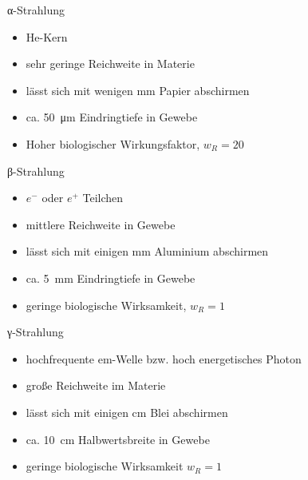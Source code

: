 \begin{frame}{α-Strahlung}
	\begin{itemize}
		\item He-Kern
		\item sehr geringe Reichweite in Materie
		\item lässt sich mit wenigen \si{\milli \meter} Papier abschirmen
		\item ca. \SI{50}{\micro \meter} Eindringtiefe in Gewebe
		\item Hoher biologischer Wirkungsfaktor, $w_R=20$
	\end{itemize}
\end{frame}
\begin{frame}{β-Strahlung}
\begin{itemize}
	\item $e^-$ oder $e^+$ Teilchen
	\item mittlere Reichweite in Gewebe
	\item lässt sich mit einigen \si{\milli \meter} Aluminium abschirmen
	\item ca. \SI{5}{\milli \meter} Eindringtiefe in Gewebe
	\item geringe biologische Wirksamkeit, $w_R=1$
\end{itemize}
\end{frame}
\begin{frame}{γ-Strahlung}
	\begin{itemize}
		\item hochfrequente em-Welle bzw. hoch energetisches Photon
		\item große Reichweite im Materie
		\item lässt sich mit einigen \si{\centi \meter} Blei abschirmen
		\item ca. \SI{10}{\centi \meter} Halbwertsbreite in Gewebe
		\item geringe biologische Wirksamkeit $w_R=1$
	\end{itemize}
 \nocite{uni_giessen}
\end{frame}
